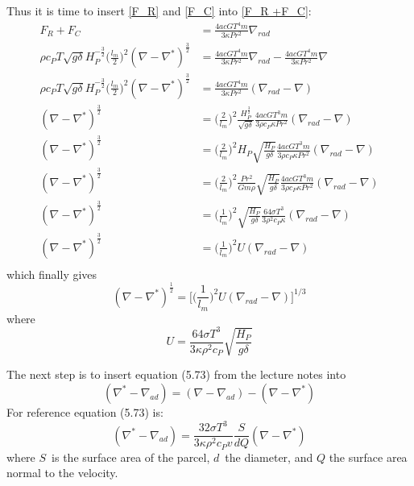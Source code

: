 \documentclass[a4paper,12pt]{article}
\begin{document}
Thus it is time to insert \ref{F_R} and \ref{F_C} into \ref{F_R +F_C}:
\begin{equation*}
\begin{aligned}
 F_R + F_C &= \frac{4acGT^4 m}{3\kappa Pr^2}\nabla_{rad}\\
\rho c_P T \sqrt{g\delta}H_P^{-\frac{3}{2}}\bigg(\frac{l_m}{2}\bigg)^2(\nabla - \nabla^*)^{\frac{3}{2}} &= \frac{4acGT^4 m}{3\kappa Pr^2}\nabla_{rad} - \frac{4acGT^4 m}{3\kappa Pr^2}\nabla\\
\rho c_P T \sqrt{g\delta}H_P^{-\frac{3}{2}}\bigg(\frac{l_m}{2}\bigg)^2(\nabla - \nabla^*)^{\frac{3}{2}} &= \frac{4acGT^4 m}{3\kappa Pr^2}(\nabla_{rad} - \nabla)\\
(\nabla - \nabla^*)^{\frac{3}{2}} &= \bigg(\frac{2}{l_m}\bigg)^2\frac{ H_P^{\frac{3}{2}}}{\sqrt{g\delta}}\frac{4acGT^3 m}{3\rho c_P\kappa Pr^2}(\nabla_{rad} - \nabla)\\
(\nabla - \nabla^*)^{\frac{3}{2}} &= \bigg(\frac{2}{l_m}\bigg)^2 H_P\sqrt{\frac{H_P}{g\delta}}\frac{4acGT^3 m}{3\rho c_P\kappa Pr^2}(\nabla_{rad} - \nabla)\\
(\nabla - \nabla^*)^{\frac{3}{2}} &= \bigg(\frac{2}{l_m}\bigg)^2 \frac{Pr^2}{Gm\rho}\sqrt{\frac{H_P}{g\delta}}\frac{4acGT^3 m}{3\rho c_P\kappa Pr^2}(\nabla_{rad} - \nabla)\\
(\nabla - \nabla^*)^{\frac{3}{2}} &= \bigg(\frac{1}{l_m}\bigg)^2 \sqrt{\frac{H_P}{g\delta}}\frac{64\sigma T^3}{3\rho^2 c_P\kappa}(\nabla_{rad} - \nabla)\\
(\nabla - \nabla^*)^{\frac{3}{2}} &= \bigg(\frac{1}{l_m}\bigg)^2 U(\nabla_{rad} - \nabla)\\
\end{aligned}
\end{equation*}
which finally gives
\begin{equation}
 (\nabla - \nabla^*)^{\frac{1}{2}} = \bigg[\bigg(\frac{1}{l_m}\bigg)^2 U(\nabla_{rad} - \nabla)\bigg]^{1/3}
\label{xi_1}
\end{equation}
where 
\begin{equation*}
 U = \frac{64\sigma T^3}{3\kappa\rho^2 c_P}\sqrt{\frac{H_P}{g\delta}}
\end{equation*}

The next step is to insert equation (5.73) from the lecture notes into
\begin{equation}
 (\nabla^* - \nabla_{ad} ) = (\nabla -\nabla_{ad} ) - (\nabla - \nabla^* )
\end{equation}
For reference equation (5.73) is:
\begin{equation*}
 (\nabla^* - \nabla_{ad}) = \frac{32\sigma T^3}{3\kappa\rho^2 c_P v}\frac{S}{dQ}(\nabla - \nabla^*)
\end{equation*}
where $S$ is the surface area of the parcel, $d$ the diameter, and $Q$ the surface area normal to the velocity.
\end{document}
